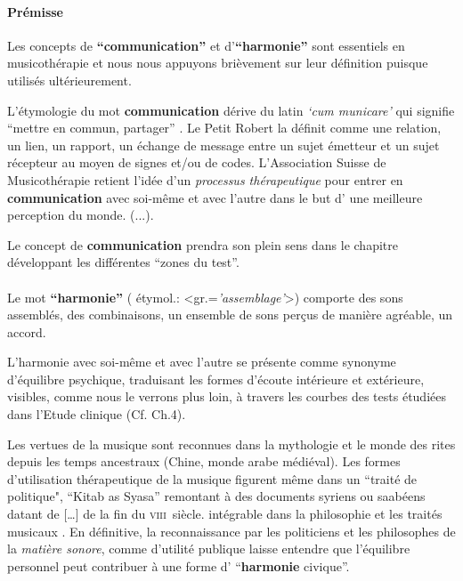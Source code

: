 \paragraph{Prémisse}





Les concepts de \textbf{``communication''} et  d'\textbf{``harmonie''}
sont essentiels en
musicothérapie et nous nous appuyons brièvement
sur leur définition puisque utilisés ultérieurement.


L'étymologie du mot  \textbf{communication} dérive du latin  \textit{`cum
  municare'} qui signifie ``mettre en commun, partager'' \autocite{dicpetitrobert}.
Le Petit Robert la définit comme une
relation, un lien, un rapport, un échange de message entre un sujet émetteur et un
sujet récepteur au moyen de signes et/ou de codes.
L'Association Suisse
de Musicothérapie retient l'idée d'un\textit{ processus thérapeutique }pour entrer en \textbf{communication} avec soi-même et avec
l'autre dans le but d' une meilleure perception du
monde. (...)\autocite{site_musitherapy}.


Le concept de \textbf{communication} prendra son plein sens
dans le chapitre développant les différentes ``zones du test''.
\paragraph{}
Le mot \textbf{``harmonie''} ( étymol.:
<gr.=\textit{'assemblage'}>) comporte
 des sons assemblés, des combinaisons, un ensemble de sons perçus de
 manière agréable, un accord.

 L'harmonie avec soi-même et avec l'autre se présente comme  synonyme d'équilibre
psychique, traduisant les formes d'écoute intérieure et
extérieure,  visibles, comme nous le verrons plus loin, à travers les courbes des tests étudiées
dans l'Etude clinique (Cf. Ch.4).

Les vertues de la musique sont reconnues dans la mythologie et le
monde des rites depuis les temps ancestraux (Chine, monde arabe
médiéval).
Les formes d'utilisation
thérapeutique de la musique figurent même dans un ``traité de politique",
``Kitab as Syasa'' remontant à des documents syriens ou saabéens datant de  [\dots] de la fin du
\textsc{viii}\ieme\ siècle.   intégrable dans la
philosophie et les traités musicaux \autocite[ch. III, p.
96]{vrait_musicotherapie_2018}.
En définitive, la reconnaissance par les  politiciens  et les
philosophes de la \textit{matière sonore}, comme d'utilité
publique laisse entendre que l'équilibre personnel
peut contribuer à une forme d' ``\textbf{harmonie }civique''.


